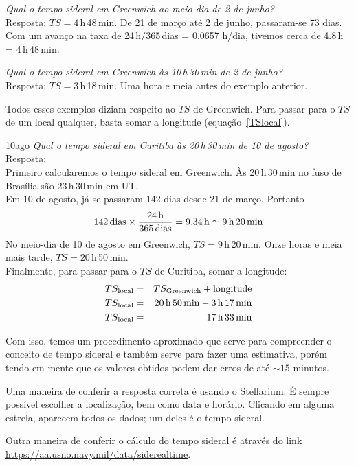 \begin{exemplo}{6}
\textit{Qual o tempo sideral em Greenwich ao meio-dia de 2 de junho?}\\

Resposta: $TS = 4$\,h\,48\,min. De 21 de março até 2 de junho, passaram-se 73 dias. Com um avanço na taxa de 24\,h/365\,dias = 0.0657 h/dia, tivemos cerca de 4.8\,h = 4\,h\,48\,min.
\end{exemplo}

\begin{exemplo}{7}
\textit{Qual o tempo sideral em Greenwich às 10\,h\,30\,min de 2 de junho?}\\

Resposta: $TS = 3$\,h\,18\,min. Uma hora e meia antes do exemplo anterior.
\end{exemplo}

Todos esses exemplos diziam respeito ao $TS$ de Greenwich. Para passar para o $TS$ de um local qualquer, basta somar a longitude (equação~\ref{TSlocal}).\\

\begin{exemplo}{10ago}
\textit{Qual o tempo sideral em Curitiba às 20\,h\,30\,min de 10 de agosto?}\\

Resposta:\\

Primeiro calcularemos o tempo sideral em Greenwich. Às 20\,h\,30\,min no fuso de Brasília são 23\,h\,30\,min em UT.\\

Em 10 de agosto, já se passaram 142 dias desde 21 de março. Portanto
\[
142\,\text{dias} \times \frac{24\,{\rm h}}{365\,{\rm dias}} = 9.34\,{\rm h} \simeq 9\,{\rm h}\,20\,{\rm min}  
\]
No meio-dia de 10 de agosto em Greenwich, $TS=9$\,h\,20\,min. Onze horas e meia mais tarde, $TS=20$\,h\,50\,min.\\

Finalmente, para passar para o $TS$ de Curitiba, somar a longitude:
\begin{eqnarray*}
TS_{\rm local} &=& TS_{\rm Greenwich} + \text{longitude}\\
TS_{\rm local} &=& 20\,{\rm h}\,50\,{\rm min} - 3\,{\rm h}\,17\,{\rm min} \\
TS_{\rm local} &=&  17\,{\rm h}\,33\,{\rm min}
\end{eqnarray*}

\end{exemplo}

Com isso, temos um procedimento aproximado que serve para compreender o conceito de tempo sideral e também serve para fazer uma estimativa, porém tendo em mente que os valores obtidos podem dar erros de até ${\sim}15$ minutos.

Uma maneira de conferir a resposta correta é usando o Stellarium. É sempre possível escolher a localização, bem como data e horário. Clicando em alguma estrela, aparecem todos os dados; um deles é o tempo sideral.
 
Outra maneira de conferir o cálculo do tempo sideral é através do link \url{https://aa.usno.navy.mil/data/siderealtime}.
